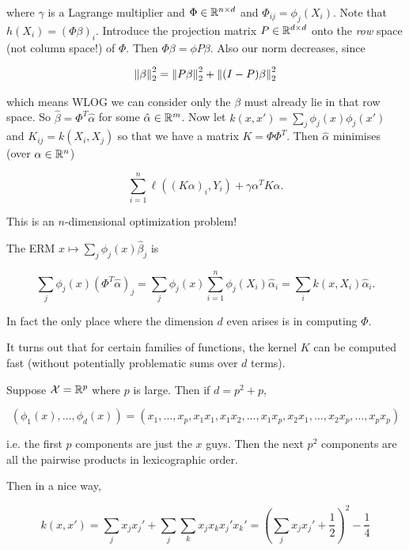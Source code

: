 \documentclass[11pt]{scrartcl}
\begin{document}
where $\gamma$ is a Lagrange multiplier and $\Phi \in \mathbb R^{n \times d}$ and $\Phi_{ij} = \phi_j(X_i)$. Note that $h(X_i) = (\Phi \beta)_i$. Introduce the projection matrix $P\in \mathbb R^{d \times d}$ onto the \emph{row} space (not column space!) of $\Phi$. Then $\Phi \beta = \phi P \beta$. Also our norm decreases, since 

\begin{equation}
    \left\lVert\beta\right\rVert_2^2 = \left\lVert P\beta\right\rVert_2^2 + \left\lVert(I-P)\beta\right\rVert_2^2
\end{equation}

which means WLOG we can consider only the $\beta$ must already lie in that row space. So $\hat{\beta} = \Phi^T \hat{\alpha}$ for some $\hat{\alpha} \in \mathbb R^m$. Now let $k(x,x') = \sum_j \phi_j(x) \phi_j(x')$ and $K_{ij} = k(X_i,X_j)$ so that we have a  matrix $K = \Phi \Phi^T$. Then $\hat{\alpha}$ minimises (over $\alpha \in \mathbb R^n$)

\begin{equation}
    \sum_{i=1}^n \ell((K\alpha)_i, Y_i) + \gamma \alpha^T K \alpha.
\end{equation}

This is an $n$-dimensional optimization problem!

The ERM $x \mapsto \sum_j \phi_j (x) \hat{\beta}_j$ is

\begin{equation} 
    \sum_j \phi_j (x) (\Phi^T \hat{\alpha})_j = \sum_j \phi_j(x) \sum_{i=1}^n \phi_j(X_i) \hat{\alpha}_i = \sum_i k(x, X_i) \hat{\alpha}_i.
\end{equation}

In fact the only place where the dimension $d$ even arises is in computing $\Phi$.

It turns out that for certain families of functions, the kernel $K$ can be computed fast (without potentially problematic sums over $d$ terms).

\begin{example}

Suppose $\mathcal{X}= \mathbb R^p$ where $p$
is large. Then if $d=p^2+p$,

\begin{equation}
    (\phi_1(x), ... , \phi_d(x)) = (x_1, ... , x_p, x_1x_1, x_1x_2, ... , x_1x_p, x_2x_1, ... , x_2x_p, ... , x_px_p)
\end{equation}

i.e. the first $p$ components are just the $x$ guys. Then the next $p^2$ components are all the pairwise products in lexicographic order.

Then in a nice way,

\begin{equation}
    k(x, x') = \sum_j x_j x_j' + \sum_j \sum_k x_j x_k x_j' x_k' = \left( \sum_j x_j x_j' + \frac12 \right)^2 - \frac14
\end{equation}
\end{example}
\end{document}

